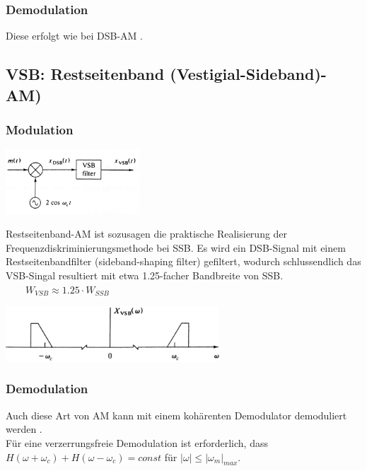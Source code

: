 \subsubsection{Demodulation}
Diese erfolgt wie bei DSB-AM .\\


\subsection{VSB: Restseitenband (Vestigial-Sideband)-AM)}
\subsubsection{Modulation}
\begin{minipage}[t][2.2cm][c]{5.5cm}
    \includegraphics[width=5cm]{bilder/am_vsb_modulator.png}
\end{minipage}
\begin{minipage}[t][2.2cm][c]{12.5cm}	
Restseitenband-AM ist sozusagen die praktische Realisierung der Frequenzdiskriminierungsmethode bei
SSB. Es wird ein DSB-Signal mit einem Restseitenbandfilter (sideband-shaping filter) gefiltert,
wodurch schlussendlich das VSB-Singal resultiert mit etwa 1.25-facher Bandbreite von SSB.
$ \qquad  W_{VSB} \approx 1.25 \cdot W_{SSB} $
\end{minipage}
\begin{center}
    \includegraphics[width=8cm]{bilder/am_vsb_spektrum.png}
\end{center}

\subsubsection{Demodulation}
Auch diese Art von AM kann mit einem kohärenten Demodulator demoduliert
werden .\\
Für eine verzerrungsfreie Demodulation ist erforderlich, dass $H(\omega +
\omega_c) + H(\omega - \omega_c) = const$ für $|\omega| \leq |\omega_m|_{max}$.




